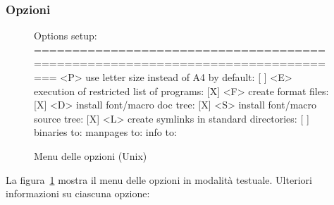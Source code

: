 \documentclass{article}
\begin{document}
\subsubsection{Opzioni}
\label{sec:options}

\begin{figure}[tbh]
\begin{boxedverbatim}
Options setup:
===============================================================================
 <P> use letter size instead of A4 by default: [ ]
 <E> execution of restricted list of programs: [X]
 <F> create format files:                      [X]
 <D> install font/macro doc tree:              [X]
 <S> install font/macro source tree:           [X]
 <L> create symlinks in standard directories:  [ ]
            binaries to:
            manpages to:
                info to:
\end{boxedverbatim}
\caption{Menu delle opzioni (Unix)}\label{fig:options-text}
\end{figure}

La figura~\ref{fig:options-text} mostra il menu delle opzioni in modalità
testuale. Ulteriori informazioni su ciascuna opzione:
\end{document}
